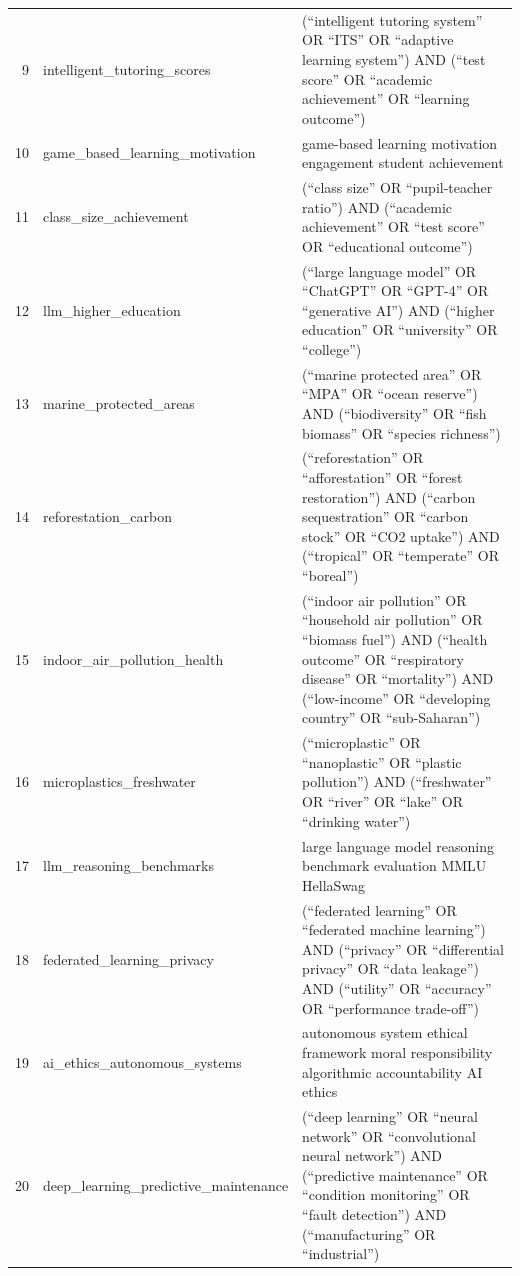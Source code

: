 \documentclass[12pt]{article}
\begin{document}
\begin{longtable}{rp{3.5cm}p{8cm}}
9 & intelligent\_tutoring\_scores & (``intelligent tutoring system'' OR ``ITS'' OR ``adaptive learning system'') AND (``test score'' OR ``academic achievement'' OR ``learning outcome'') \\
10 & game\_based\_learning\_motivation & game-based learning motivation engagement student achievement \\
11 & class\_size\_achievement & (``class size'' OR ``pupil-teacher ratio'') AND (``academic achievement'' OR ``test score'' OR ``educational outcome'') \\
12 & llm\_higher\_education & (``large language model'' OR ``ChatGPT'' OR ``GPT-4'' OR ``generative AI'') AND (``higher education'' OR ``university'' OR ``college'') \\
13 & marine\_protected\_areas & (``marine protected area'' OR ``MPA'' OR ``ocean reserve'') AND (``biodiversity'' OR ``fish biomass'' OR ``species richness'') \\
14 & reforestation\_carbon & (``reforestation'' OR ``afforestation'' OR ``forest restoration'') AND (``carbon sequestration'' OR ``carbon stock'' OR ``CO2 uptake'') AND (``tropical'' OR ``temperate'' OR ``boreal'') \\
15 & indoor\_air\_pollution\_health & (``indoor air pollution'' OR ``household air pollution'' OR ``biomass fuel'') AND (``health outcome'' OR ``respiratory disease'' OR ``mortality'') AND (``low-income'' OR ``developing country'' OR ``sub-Saharan'') \\
16 & microplastics\_freshwater & (``microplastic'' OR ``nanoplastic'' OR ``plastic pollution'') AND (``freshwater'' OR ``river'' OR ``lake'' OR ``drinking water'') \\
17 & llm\_reasoning\_benchmarks & large language model reasoning benchmark evaluation MMLU HellaSwag \\
18 & federated\_learning\_privacy & (``federated learning'' OR ``federated machine learning'') AND (``privacy'' OR ``differential privacy'' OR ``data leakage'') AND (``utility'' OR ``accuracy'' OR ``performance trade-off'') \\
19 & ai\_ethics\_autonomous\_systems & autonomous system ethical framework moral responsibility algorithmic accountability AI ethics \\
20 & deep\_learning\_predictive\_maintenance & (``deep learning'' OR ``neural network'' OR ``convolutional neural network'') AND (``predictive maintenance'' OR ``condition monitoring'' OR ``fault detection'') AND (``manufacturing'' OR ``industrial'') \\
\end{longtable}
\end{document}
